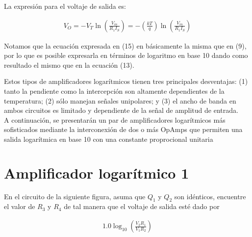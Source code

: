 \documentclass{article}
\begin{document}
\noindent La expresión para el voltaje de salida es:

\begin{align}
	V_O = -V_T \ln \left( \frac{V_{in}}{R_1I_S} \right) = -\left( \frac{kT}{q} \right) \ln \left( \frac{V_{in}}{R_1I_S} \right)
\end{align}

\noindent Notamos que la ecuación expresada en (15) en básicamente la misma que en (9), por lo que es posible expresarla en términos de logaritmo en base 10 dando como resultado el mismo que en la ecuación (13).

\noindent Estos tipos de amplificadores logarítmicos  tienen tres principales desventajas: (1) tanto la pendiente como la intercepción son altamente dependientes de la temperatura; (2) sólo manejan señales unipolares; y (3) el ancho de banda en ambos circuitos es limitado y dependiente de la señal de amplitud de entrada. \\

\noindent A continuación, se presentarán un par de amplificadores logarítmicos más sofisticados mediante la interconexión de dos o más OpAmps que permiten una salida logarítmica en base 10 con una constante proprocional unitaria

\section*{Amplificador logarítmico 1}
En el circuito de la siguiente figura, asuma que $Q_1$ y $Q_2$ son idénticos, encuentre el valor de $R_3$ y $R_4$ de tal manera que el voltaje de salida esté dado por 

\begin{align}
	1.0 \log_{10} \left( \frac{V_2 R_1}{V_1 R_2} \right)
\end{align}
\end{document}
